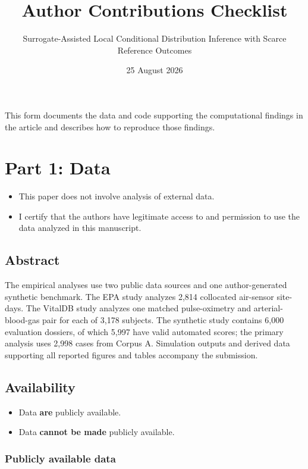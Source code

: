 \documentclass[
  10pt,
]{article}
\title{Author Contributions Checklist}
\subtitle{Surrogate-Assisted Local Conditional Distribution Inference
with Scarce Reference Outcomes}
\author{}
\date{\vspace{-2.5em}25 August 2026}
\providecommand{\tightlist}{%
  \setlength{\itemsep}{0pt}\setlength{\parskip}{0pt}}
\begin{document}
\maketitle

This form documents the data and code supporting the computational
findings in the article and describes how to reproduce those findings.

\section{Part 1: Data}\label{part-1-data}

\begin{itemize}
\item[$\square$]
  This paper does not involve analysis of external data.
\item[$\boxtimes$]
  I certify that the authors have legitimate access to and permission to
  use the data analyzed in this manuscript.
\end{itemize}

\subsection{Abstract}\label{abstract}

The empirical analyses use two public data sources and one
author-generated synthetic benchmark. The EPA study analyzes 2,814
collocated air-sensor site-days. The VitalDB study analyzes one matched
pulse-oximetry and arterial-blood-gas pair for each of 3,178 subjects.
The synthetic study contains 6,000 evaluation dossiers, of which 5,997
have valid automated scores; the primary analysis uses 2,998 cases from
Corpus A. Simulation outputs and derived data supporting all reported
figures and tables accompany the submission.

\subsection{Availability}\label{availability}

\begin{itemize}
\tightlist
\item[$\boxtimes$]
  Data \textbf{are} publicly available.
\item[$\square$]
  Data \textbf{cannot be made} publicly available.
\end{itemize}

\subsubsection{Publicly available data}\label{publicly-available-data}
\end{document}
